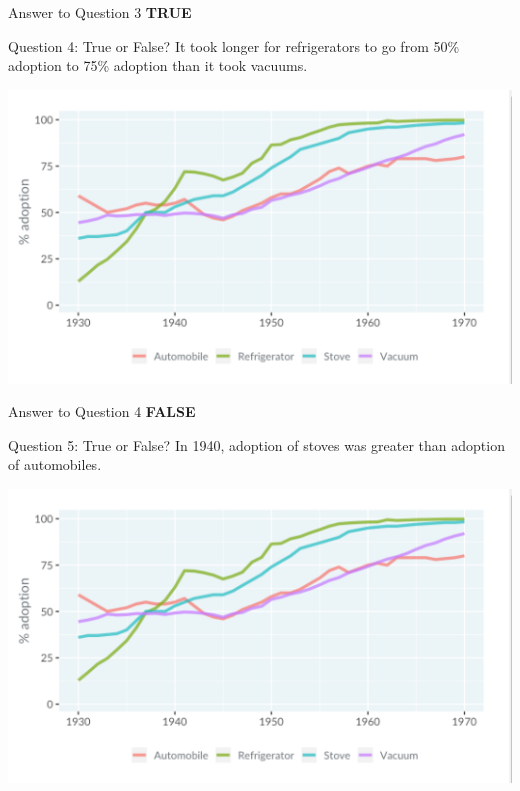 \documentclass[
  ignorenonframetext,
]{beamer}
\begin{document}
\begin{frame}{Answer to Question 3}
\label{answer-to-question-3-1}
\textbf{TRUE}
\end{frame}

\begin{frame}{Question 4: True or False?}
\label{question-4-true-or-false-1}
It took longer for refrigerators to go from 50\% adoption to 75\%
adoption than it took vacuums.

\includegraphics{../images/im48.png}
\end{frame}

\begin{frame}{Answer to Question 4}
\label{answer-to-question-4-1}
\textbf{FALSE}
\end{frame}

\begin{frame}{Question 5: True or False?}
\label{question-5-true-or-false-1}
In 1940, adoption of stoves was greater than adoption of automobiles.

\includegraphics{../images/im48.png}
\end{frame}
\end{document}
